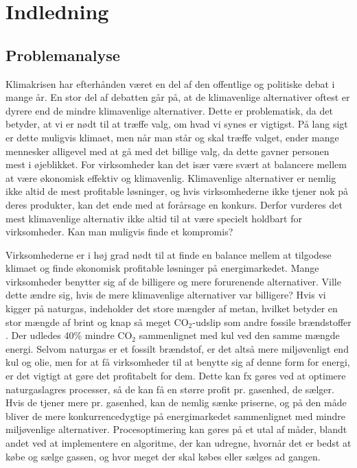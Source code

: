 \chapter{Indledning}
\section{Problemanalyse}
Klimakrisen har efterhånden været en del af den offentlige og politiske debat i mange år. En stor del af debatten går på, at de klimavenlige alternativer oftest er dyrere end de mindre klimavenlige alternativer. Dette er problematisk, da det betyder, at vi er nødt til at træffe valg, om hvad vi synes er vigtigst. På lang sigt er dette muligvis klimaet, men når man står og skal træffe valget, ender mange mennesker alligevel med at gå med det billige valg, da dette gavner personen mest i øjeblikket.
For virksomheder kan det især være svært at balancere mellem at være økonomisk effektiv og klimavenlig. Klimavenlige alternativer er nemlig ikke altid de mest profitable løsninger, og hvis virksomhederne ikke tjener nok på deres produkter, kan det ende med at forårsage en konkurs. Derfor vurderes det mest klimavenlige alternativ ikke altid til at være specielt holdbart for virksomheder. Kan man muligvis finde et kompromis? 

Virksomhederne er i høj grad nødt til at finde en balance mellem at tilgodese klimaet og finde økonomisk profitable løsninger på energimarkedet. Mange virksomheder benytter sig af de billigere og mere forurenende alternativer. Ville dette ændre sig, hvis de mere klimavenlige alternativer var billigere?
Hvis vi kigger på naturgas, indeholder det store mængder af metan, hvilket betyder en stor mængde af brint og knap så meget $\textrm{CO}_2$-udslip som andre fossile brændstoffer \citep{naturgas}. Der udledes 40\% mindre CO$_{2}$ sammenlignet med kul ved den samme mængde energi. Selvom naturgas er et fossilt brændstof, er det altså mere miljøvenligt end kul og olie, men for at få virksomheder til at benytte sig af denne form for energi, er det vigtigt at gøre det profitabelt for dem. Dette kan fx gøres ved at optimere naturgaslagres processer, så de kan få en større profit pr. gasenhed, de sælger. Hvis de tjener mere pr. gasenhed, kan de nemlig sænke priserne, og på den måde bliver de mere konkurrencedygtige på energimarkedet sammenlignet med mindre miljøvenlige alternativer.
Procesoptimering kan gøres på et utal af måder, blandt andet ved at implementere en algoritme, der kan udregne, hvornår det er bedst at købe og sælge gassen, og hvor meget der skal købes eller sælges ad gangen. 

